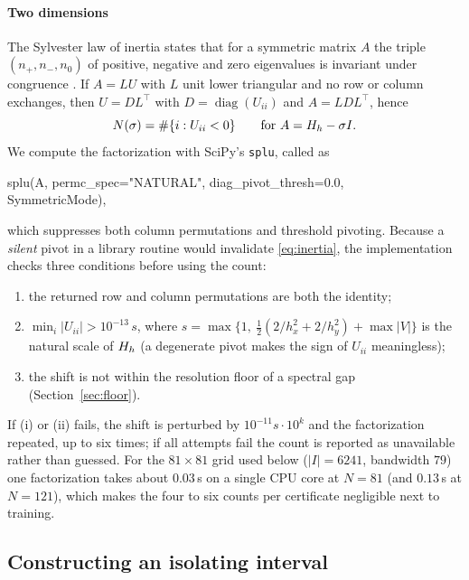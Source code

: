 \paragraph{Two dimensions} The Sylvester law of inertia states that for a
symmetric matrix $A$ the triple $(n_+,n_-,n_0)$ of positive, negative and zero
eigenvalues is invariant under congruence \citep{golub2013}. If $A=LU$ with $L$ unit lower
triangular and no row or column exchanges, then $U=DL^{\!\top}$ with
$D=\operatorname{diag}(U_{ii})$ and $A=LDL^{\!\top}$, hence
\begin{equation}
  N(\sigma) = \#\{i : U_{ii}<0\}
  \qquad\text{for } A=H_h-\sigma I .
  \label{eq:inertia}
\end{equation}
We compute the factorization with SciPy's \texttt{splu}, called as
\begin{center}\small\ttfamily
splu(A, permc\_spec="NATURAL", diag\_pivot\_thresh=0.0,\\
\hspace*{2em}SymmetricMode),
\end{center}
which suppresses both column permutations and threshold pivoting. Because a \emph{silent} pivot in a library routine would
invalidate \eqref{eq:inertia}, the implementation checks three conditions
before using the count:
\begin{enumerate}
\item the returned row and column permutations are both the identity;
\item $\min_i |U_{ii}| > 10^{-13}\,s$, where
  $s=\max\{1,\ \tfrac12(2/h_x^2+2/h_y^2)+\max|V|\}$ is the natural scale of
  $H_h$ (a degenerate pivot makes the sign of $U_{ii}$ meaningless);
\item the shift is not within the resolution floor of a spectral gap
  (Section~\ref{sec:floor}).
\end{enumerate}
If (i) or (ii) fails, the shift is perturbed by $10^{-11}s\cdot10^{k}$ and the
factorization repeated, up to six times; if all attempts fail the count is
reported as unavailable rather than guessed. For the $81\times81$ grid used
below ($|I|=6241$, bandwidth $79$) one factorization takes about $0.03$\,s on a single CPU
core at $N=81$ (and $0.13$\,s at $N=121$), which makes the four to six
counts per certificate negligible next to training.

\subsection{Constructing an isolating interval}
\label{sec:isolating}

